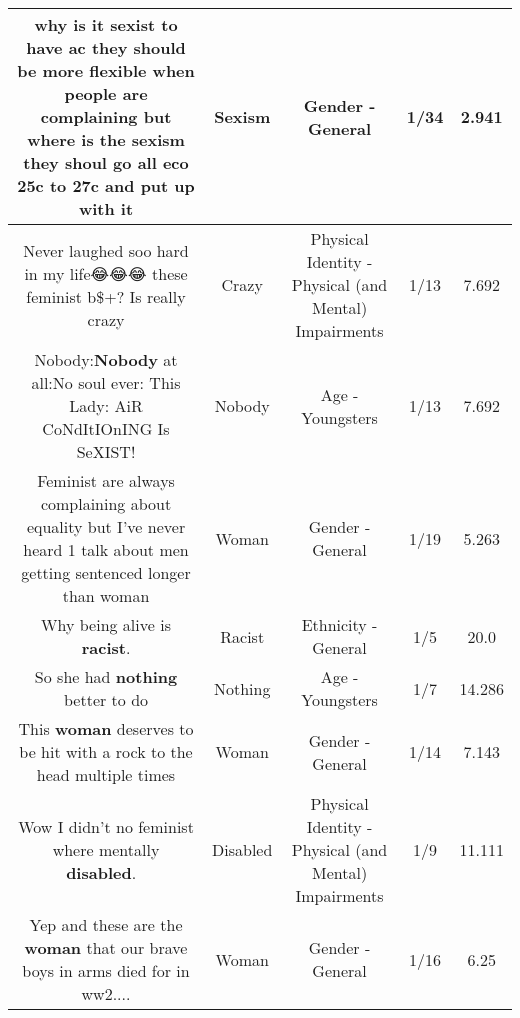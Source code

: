 \documentclass[11pt]{article}
\newlength\mylength
\begin{document}
\begin{center}
\begin{longtable}{|C{.65\mylength}|C{.30\mylength}|C{.12\mylength}|C{.12\mylength}|C{.12\mylength}|}
  \small why is it sexist to have ac they should be more flexible when people are complaining but where is the \textbf{sexism} they  shoul go all eco 25c to 27c and put up with it\normalsize   & Sexism & Gender - General & 1/34 & 2.941 \\  \hline
  \small Never laughed soo hard in my life😂😂😂 these feminist b\$+\@? Is really crazy\normalsize   & Crazy & Physical Identity - Physical (and Mental) Impairments & 1/13 & 7.692 \\  \hline
  \small Nobody:\textbf{Nobody} at all:No soul ever: This Lady: AiR CoNdItIOnING Is SeXIST!\normalsize   & Nobody & Age - Youngsters & 1/13 & 7.692 \\  \hline
  \small Feminist are always complaining about equality but I've never heard 1 talk about men getting sentenced longer than woman\normalsize   & Woman & Gender - General & 1/19 & 5.263 \\  \hline
  \small Why being alive is \textbf{racist}.\normalsize   & Racist & Ethnicity - General & 1/5 & 20.0 \\  \hline
  \small So she had \textbf{nothing} better to do\normalsize   & Nothing & Age - Youngsters & 1/7 & 14.286 \\  \hline
  \small This \textbf{woman} deserves to be hit with a rock to the head multiple times\normalsize   & Woman & Gender - General & 1/14 & 7.143 \\  \hline
  \small Wow I didn't no feminist where mentally \textbf{disabled}.  🧐\normalsize   & Disabled & Physical Identity - Physical (and Mental) Impairments & 1/9 & 11.111 \\  \hline
  \small Yep and these are the \textbf{woman} that our brave boys in arms died for in ww2....\normalsize   & Woman & Gender - General & 1/16 & 6.25 \\  \hline

\end{longtable}
\end{center}
\end{document}
